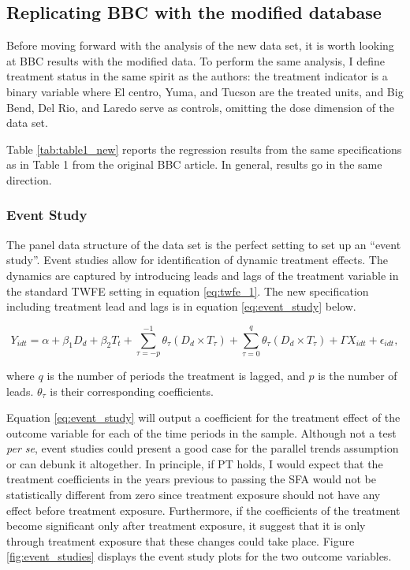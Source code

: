 \documentclass[titlepage]{article}
\theoremstyle{plain}
\theoremstyle{plain}
\begin{document}
\subsection*{Replicating BBC with the modified database}

Before moving forward with the analysis of the new data set, it is worth looking at BBC results with the modified data. To perform the same analysis, I define treatment status in the same spirit as the authors: the treatment indicator is a binary variable where El centro, Yuma, and Tucson are the treated units, and Big Bend, Del Rio, and Laredo serve as controls, omitting the dose dimension of the data set.

Table \ref{tab:table1_new} reports the regression results from the same specifications as in Table 1 from the original BBC article. In general, results go in the same direction.



\subsubsection*{Event Study}

The panel data structure of the data set is the perfect setting to set up an \enquote{event study}. Event studies allow for identification of dynamic treatment effects. The dynamics are captured by introducing leads and lags of the treatment variable in the standard TWFE setting in equation \ref{eq:twfe_1}. The new specification including treatment lead and lags is in equation \ref{eq:event_study} below.

\begin{equation}
	\label{eq:event_study}
	Y_{idt} = \alpha + \beta_{1}\textit{D}_{d} + \beta_{2}\textit{T}_{t} + \sum_{\tau = -p}^{-1}\theta_{\tau}(\textit{D}_{d} \times \textit{T}_{\tau}) + \sum_{\tau = 0}^{q}\theta_{\tau}(\textit{D}_{d} \times \textit{T}_{\tau})+ \Gamma X_{idt} + \epsilon_{idt},
\end{equation}

\noindent where $q$ is the number of periods the treatment is lagged, and $p$ is the number of leads. $\theta_{\tau}$ is their corresponding coefficients.

Equation \ref{eq:event_study} will output a coefficient for the treatment effect of the outcome variable for each of the time periods in the sample. Although not a test \textit{per se}, event studies could present a good case for the parallel trends assumption or can debunk it altogether. In principle, if PT holds, I would expect that the treatment coefficients in the years previous to passing the SFA would not be statistically different from zero since treatment exposure should not have any effect before treatment exposure. Furthermore, if the coefficients of the treatment become significant only after treatment exposure, it suggest that it is only through treatment exposure that these changes could take place. Figure \ref{fig:event_studies} displays the event study plots for the two outcome variables.
\end{document}
